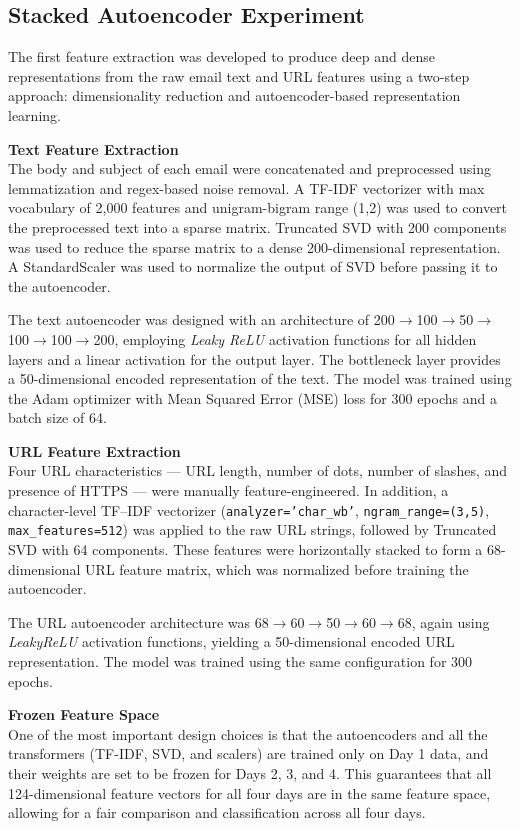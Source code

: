\subsection{Stacked Autoencoder Experiment}
The first feature extraction was developed to produce deep and dense representations from the raw email text and URL features using a two-step approach: dimensionality reduction and autoencoder-based representation learning.

\textbf{Text Feature Extraction}\\ 
The body and subject of each email were concatenated and preprocessed using lemmatization and regex-based noise removal. A TF-IDF vectorizer with max vocabulary of 2,000 features and unigram-bigram range (1,2) was used to convert the preprocessed text into a sparse matrix. Truncated SVD with 200 components was used to reduce the sparse matrix to a dense 200-dimensional representation. A StandardScaler was used to normalize the output of SVD before passing it to the autoencoder.

The text autoencoder was designed with an architecture of 200$\rightarrow$100$\rightarrow$50$\rightarrow$100$\rightarrow$100$\rightarrow$200, employing \textit{Leaky ReLU} activation functions for all hidden layers and a linear activation for the output layer. The bottleneck layer provides a 50-dimensional encoded representation of the text. The model was trained using the Adam optimizer with Mean Squared Error (MSE) loss for 300 epochs and a batch size of 64.

\textbf{URL Feature Extraction}\\
Four URL characteristics --- URL length, number of dots, number of slashes, and presence of HTTPS --- were manually feature-engineered. In addition, a character-level TF--IDF vectorizer (\texttt{analyzer='char\_wb'}, \texttt{ngram\_range=(3,5)}, \texttt{max\_features=512}) was applied to the raw URL strings, followed by Truncated SVD with 64 components. These features were horizontally stacked to form a 68-dimensional URL feature matrix, which was normalized before training the autoencoder.

The URL autoencoder architecture was 68$\rightarrow$60$\rightarrow$50$\rightarrow$60$\rightarrow$68, again using \textit{LeakyReLU} activation functions, yielding a 50-dimensional encoded URL representation. The model was trained using the same configuration for 300 epochs.

\textbf{Frozen Feature Space}\\
One of the most important design choices is that the autoencoders and all the transformers (TF-IDF, SVD, and scalers) are trained only on Day 1 data, and their weights are set to be frozen for Days 2, 3, and 4. This guarantees that all 124-dimensional feature vectors for all four days are in the same feature space, allowing for a fair comparison and classification across all four days.

